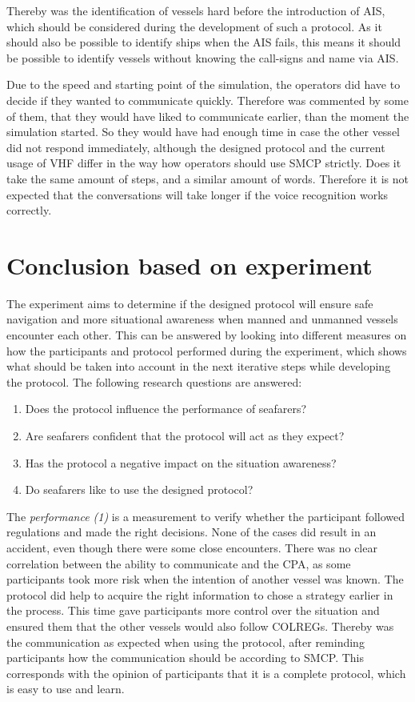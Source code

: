 Thereby was the identification of vessels hard before the introduction of AIS, which should be considered during the development of such a protocol. As it should also be possible to identify ships when the \ac{AIS} fails, this means it should be possible to identify vessels without knowing the call-signs and name via \ac{AIS}.

Due to the speed and starting point of the simulation, the operators did have to decide if they wanted to communicate quickly. Therefore was commented by some of them, that they would have liked to communicate earlier, than the moment the simulation started. So they would have had enough time in case the other vessel did not respond immediately, although the designed protocol and the current usage of \ac{VHF} differ in the way how operators should use SMCP strictly. Does it take the same amount of steps, and a similar amount of words. Therefore it is not expected that the conversations will take longer if the voice recognition works correctly.

\section{Conclusion based on experiment}
The experiment aims to determine if the designed protocol will ensure safe navigation and more situational awareness when manned and unmanned vessels encounter each other. This can be answered by looking into different measures on how the participants and protocol performed during the experiment, which shows what should be taken into account in the next iterative steps while developing the protocol. The following research questions are answered:
\begin{spacing}{1}
	\begin{enumerate}
		\item Does the protocol influence the performance of seafarers?
		\item Are seafarers confident that the protocol will act as they expect?
		\item Has the protocol a negative impact on the situation awareness?
		\item Do seafarers like to use the designed protocol?
	\end{enumerate}
\end{spacing}

The \emph{performance (1)} is a measurement to verify whether the participant followed regulations and made the right decisions. None of the cases did result in an accident, even though there were some close encounters. There was no clear correlation between the ability to communicate and the \acf{CPA}, as some participants took more risk when the intention of another vessel was known. The protocol did help to acquire the right information to chose a strategy earlier in the process. This time gave participants more control over the situation and ensured them that the other vessels would also follow \ac{COLREGs}.
Thereby was the communication as expected when using the protocol, after reminding participants how the communication should be according to \ac{SMCP}. This corresponds with the opinion of participants that it is a complete protocol, which is easy to use and learn.


